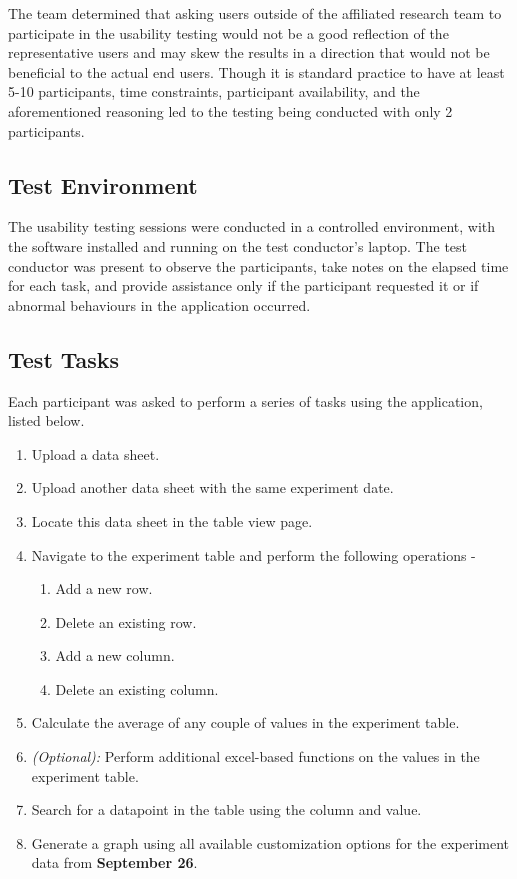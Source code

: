 \documentclass{article}
\begin{document}
The team determined that asking users outside of the affiliated research team to
participate in the usability testing would not be a good reflection of the
representative users and may skew the results in a direction that would not be
beneficial to the actual end users. Though it is standard practice to have at
least 5-10 participants, time constraints, participant availability, and the
aforementioned reasoning led to the testing being conducted with only 2
participants.

\subsection{Test Environment}
The usability testing sessions were conducted in a controlled environment, with
the software installed and running on the test conductor's laptop. The test
conductor was present to observe the participants, take notes on the elapsed
time for each task, and provide assistance only if the participant requested it
or if abnormal behaviours in the application occurred.

\subsection{Test Tasks}
Each participant was asked to perform a series of tasks using the application,
listed below.
\begin{enumerate}
    \item Upload a data sheet. \label{T1}
    \item Upload another data sheet with the same experiment date. \label{T2}
    \item Locate this data sheet in the table view page. \label{T3}
    \item Navigate to the experiment table and perform the following operations - \label{T4}
    \begin{enumerate}
      \item Add a new row.
      \item Delete an existing row.
      \item Add a new column.
      \item Delete an existing column.
    \end{enumerate}
    \item Calculate the average of any couple of values in the experiment table. \label{T5}
    \item \emph{(Optional):} Perform additional excel-based functions on the values in the experiment table.
    \item Search for a datapoint in the table using the column and value. \label{T6}
    \item Generate a graph using all available customization options for the experiment data from \textbf{September 26}. \label{T7}
\end{enumerate}
\end{document}
